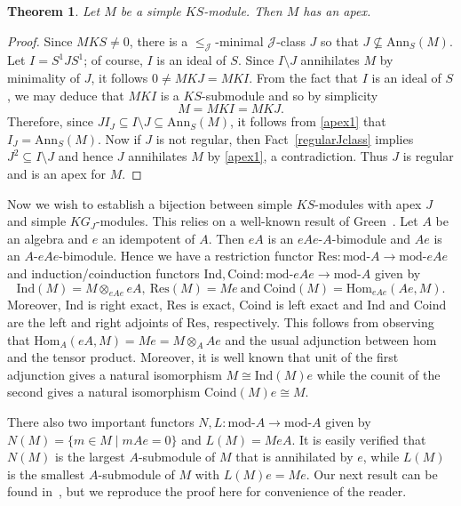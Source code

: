 \documentclass[reqno,11pt]{amsart}
\def\module#1{\mathrm{mod}\text{-}#1}
\def\Ann#1{\mathrm{Ann}_S(#1)}
\def\J{\mathrel{{\mathscr J}}} %
\def\to{\rightarrow}
\def\Thmname{Theorem}
\newtheorem{Thm}{\Thmname}%
\numberwithin{equation}{section}
\begin{document}
\begin{Thm}\label{haveapex}
Let $M$ be a simple $KS$-module.  Then $M$ has an apex.
\end{Thm}
\begin{proof}
Since $MKS\neq 0$, there is a $\leq_{\J}$-minimal $\J$-class $J$ so
that $J\nsubseteq \Ann M$.  Let $I = S^1JS^1$; of course, $I$ is an
ideal of $S$. Since $I\setminus J$ annihilates $M$
by minimality of $J$, it follows $0\neq MKJ=MKI$. From the fact that $I$ is an
ideal of $S$, we may deduce that $MKI$ is a $KS$-submodule and so  by simplicity
\begin{equation}\label{apex1}
M= MKI = MKJ.
\end{equation}
Therefore, since $JI_J\subseteq I\setminus J\subseteq \Ann M$, it follows
from \eqref{apex1} that $I_J= \Ann M$.  Now if $J$ is not regular,
then Fact~\ref{regularJclass} implies $J^2\subseteq I\setminus J$ and hence $J$
annihilates $M$ by \eqref{apex1}, a contradiction.  Thus $J$ is
regular and is an apex for $M$.
\end{proof}

Now we wish to establish a bijection between simple $KS$-modules with apex
$J$ and simple $KG_J$-modules.  This relies on a well-known result of
Green~\cite{Greenpoly}.   Let $A$ be an algebra and $e$ an idempotent
of $A$. Then $eA$ is an $eAe$-$A$-bimodule and $Ae$ is an $A$-$eAe$-bimodule.  Hence we have a
restriction functor $\mathrm{Res}:\module A\to \module {eAe}$ and induction/coinduction
functors $\mathrm{Ind},\mathrm{Coind}:\module {eAe}\to \module A$ given by
\begin{equation*}
\mathrm{Ind}(M) = M\otimes _{eAe}eA,\ \mathrm{Res}(M) = Me\ \text{and}\
\mathrm{Coind}(M) = \mathrm{Hom}_{eAe}(Ae,M).
\end{equation*}
Moreover,  $\mathrm{Ind}$ is right exact, $\mathrm{Res}$ is exact,  $\mathrm{Coind}$ is left exact and
$\mathrm{Ind}$ and $\mathrm{Coind}$ are the left and right adjoints of $\mathrm{Res}$, respectively.  This follows from observing that
$\mathrm{Hom}_A(eA,M) = Me = M\otimes_A Ae$ and the
usual adjunction between hom and the tensor product. Moreover, it is
well known that unit of the first adjunction gives a natural isomorphism
$M\cong \mathrm{Ind}(M)e$ while the counit of the second gives a
natural isomorphism $\mathrm{Coind}(M)e\cong M$.  

There also two important functors $N,L:\module A\to \module A$ given by
$N(M) = \{m\in M\mid mAe=0\}$ and $L(M) = MeA$.  It is easily verified that $N(M)$ is
the largest $A$-submodule of $M$ that is annihilated by $e$, while $L(M)$ is the smallest $A$-submodule of $M$ with $L(M)e=Me$.   Our
next result can be found in~\cite[6.2]{Greenpoly}, but we reproduce
the proof here for convenience of the reader.
\end{document}
